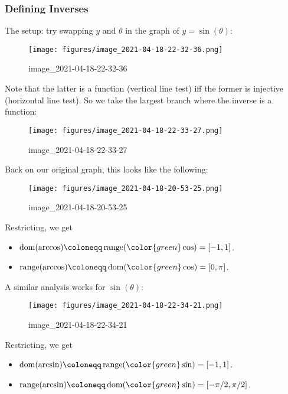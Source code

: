 \hypertarget{defining-inverses}{%
\subsubsection{Defining Inverses}\label{defining-inverses}}

\begin{remark}

The setup: try swapping \(y\) and \(\theta\) in the graph of
\(y=\sin(\theta)\):

\begin{figure}
\centering
\texttt{[image: figures/image\_2021-04-18-22-32-36.png]}
\caption{image\_2021-04-18-22-32-36}
\end{figure}

Note that the latter is a function (vertical line test) iff the former
is injective (horizontal line test). So we take the largest branch where
the inverse is a function:

\begin{figure}
\centering
\texttt{[image: figures/image\_2021-04-18-22-33-27.png]}
\caption{image\_2021-04-18-22-33-27}
\end{figure}

Back on our original graph, this looks like the following:

\begin{figure}
\centering
\texttt{[image: figures/image\_2021-04-18-20-53-25.png]}
\caption{image\_2021-04-18-20-53-25}
\end{figure}

Restricting, we get

\begin{itemize}
\tightlist
\item
  \(\operatorname{dom}(\arccos) \coloneqq\mathop{\mathrm{range}}({ \color{green} \cos} ) = [-1, 1]\).
\item
  \(\mathop{\mathrm{range}}(\arccos) \coloneqq\operatorname{dom}( {\color{green} \cos} ) = [0, \pi]\).
\end{itemize}

\end{remark}

\begin{remark}

A similar analysis works for \(\sin(\theta)\):

\begin{figure}
\centering
\texttt{[image: figures/image\_2021-04-18-22-34-21.png]}
\caption{image\_2021-04-18-22-34-21}
\end{figure}

Restricting, we get

\begin{itemize}
\tightlist
\item
  \(\operatorname{dom}(\arcsin) \coloneqq\mathop{\mathrm{range}}({ \color{green} \sin} ) = [-1, 1]\).
\item
  \(\mathop{\mathrm{range}}(\arcsin) \coloneqq\operatorname{dom}( {\color{green} \sin }) = [-\pi/2, \pi/2]\).
\end{itemize}

\end{remark}

